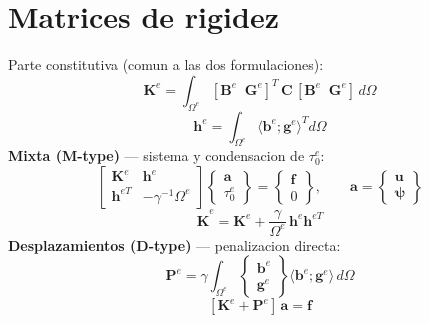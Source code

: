 \documentclass[11pt]{article}
\begin{document}
\section{Matrices de rigidez}
Parte constitutiva (comun a las dos formulaciones):
\begin{equation}
\mathbf K^{e}=\int_{\Omega^{e}}[\mathbf B^{e}\;\;\mathbf G^{e}]^{T}\,\mathbf C\,[\mathbf B^{e}\;\;\mathbf G^{e}]\,d\Omega
\tag{33}
\end{equation}
\begin{equation}
\mathbf h^{e}=\int_{\Omega^{e}}\langle \mathbf b^{e};\mathbf g^{e}\rangle^{T}d\Omega
\tag{34}
\end{equation}
\textbf{Mixta (M-type)} --- sistema y condensacion de $\tau_{0}^{e}$:
\begin{equation}
\begin{bmatrix}\mathbf K^{e} & \mathbf h^{e}\\ \mathbf h^{eT} & -\gamma^{-1}\Omega^{e}\end{bmatrix}
\begin{Bmatrix}\mathbf a\\ \tau_{0}^{e}\end{Bmatrix}
=\begin{Bmatrix}\mathbf f\\ 0\end{Bmatrix},
\qquad \mathbf a=\begin{Bmatrix}\mathbf u\\ \boldsymbol\psi\end{Bmatrix}
\tag{35}
\end{equation}
\begin{equation}
\boxed{\;\hat{\mathbf K}^{e}=\mathbf K^{e}+\frac{\gamma}{\Omega^{e}}\,\mathbf h^{e}\mathbf h^{eT}\;}
\tag{36}
\end{equation}
\textbf{Desplazamientos (D-type)} --- penalizacion directa:
\begin{equation}
\mathbf P^{e}=\gamma\int_{\Omega^{e}}\begin{Bmatrix}\mathbf b^{e}\\ \mathbf g^{e}\end{Bmatrix}
\langle \mathbf b^{e};\mathbf g^{e}\rangle\,d\Omega
\tag{38}
\end{equation}
\begin{equation}
\boxed{\;[\mathbf K^{e}+\mathbf P^{e}]\,\mathbf a=\mathbf f\;}
\tag{39}
\end{equation}
\end{document}
